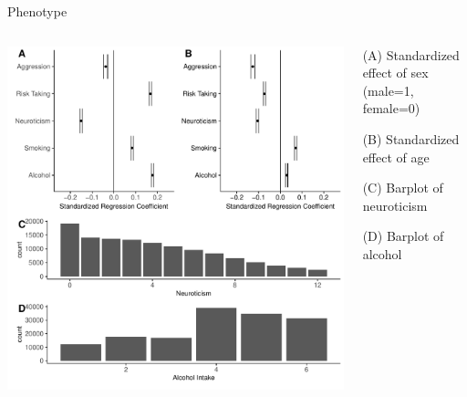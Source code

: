 \documentclass{beamer}
\begin{document}
\begin{frame}[t]{Phenotype}
  \begin{center}

    \begin{columns}[T]
      \begin{column}[T]{0.65\textwidth}
        \includegraphics[width=1\linewidth]{../ukb_assoc/figure/phenotype/descriptives_plots.pdf}
      \end{column}
      \begin{column}[T]{0.35\textwidth}
        \begin{itemize}
          {\tiny
          \item (A) Standardized effect of sex (male=1, female=0) 
          \item (B) Standardized effect of age
          \item (C) Barplot of neuroticism
          \item (D) Barplot of alcohol
          }
      \end{itemize}
    \end{column}
  \end{columns}
\end{center}
\end{frame}
\end{document}
